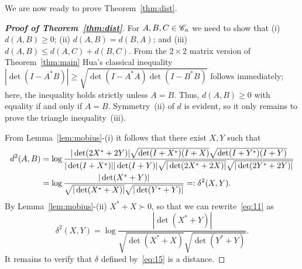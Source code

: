 \documentclass[11pt]{article}
\begin{document}
\vspace*{8pt}
We are now ready to prove Theorem~\ref{thm:dist}.
\begin{proof}[\bfseries Proof of Theorem~\ref{thm:dist}]
  For $A, B, C \in \mathscr{C}_n$ we need to show that (i) $d(A,B)\ge 0$; (ii) $d(A,B)=d(B,A)$; and (iii) $d(A,B) \le d(A,C)+d(B,C)$. From the $2\times 2$ matrix version of Theorem~\ref{thm:main} Hua's classical inequality $|\det(I-A^*B)|\ge \sqrt{\det(I-A^*A)\det(I-B^*B)}$ follows immediately; here, the inequality holds strictly unless $A=B$. Thus, $d(A,B) \ge 0$ with equality if and only if $A=B$. Symmetry~(ii) of $d$ is evident, so it only remains to prove the triangle inequality~(iii).
  
  From Lemma~\ref{lem:mobius}-(i) it follows that there exist $X, Y$ such that
  \begin{align}
    \nonumber
    d^2(A,B) &= \log\frac{|\det(2X^*+2Y)|\sqrt{\det(I+X^*)(I+X)}\sqrt{\det(I+Y^*)(I+Y)}}
                       {|\det(I+X^*)| |\det(I+Y)|\sqrt{|\det(2X^*+2X)|}\sqrt{|\det(2Y^*+2Y)|}}\\
           \label{eq:11}
           &= \log\frac{|\det(X^*+Y)|}{\sqrt{|\det(X^*+X)|}\sqrt{|\det(Y^*+Y)|}} =: \delta^2(X,Y).
  \end{align}
  By Lemma~\ref{lem:mobius}-(ii) $X^*+X \succ 0$, so that we can rewrite~\eqref{eq:11} as
  \begin{equation}
    \label{eq:15}
    \delta^2(X,Y) = \log\frac{|\det(X^*+Y)|}{\sqrt{\det(X^*+X)}\sqrt{\det(Y^*+Y)}}.
  \end{equation}
  It remains to verify that $\delta$ defined by~\eqref{eq:15} is a distance.


\end{proof}
\end{document}

